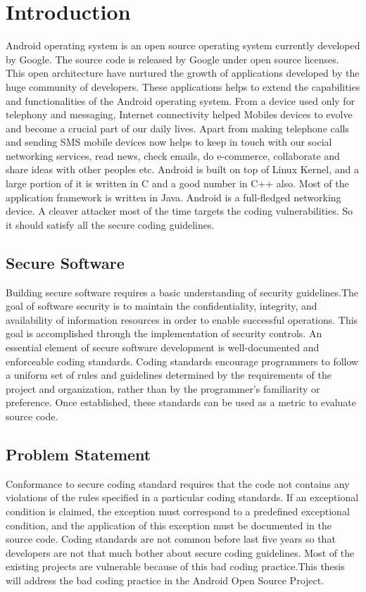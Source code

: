 \chapter{Introduction}

Android operating system is an open source operating system currently developed by Google. The source code is released by Google under open source licenses. This open architecture have nurtured the growth of applications developed by the huge community of developers. These applications helps to extend the capabilities and functionalities of the Android operating system. From a device used only for telephony and messaging, Internet connectivity helped Mobiles devices to evolve and become a crucial part of our daily lives. Apart from making telephone calls and sending SMS mobile devices now helps to keep in touch with our social networking services, read news, check emails, do e-commerce, collaborate and share ideas with other peoples etc. Android is built on top of Linux Kernel, and a large portion of it is written in C and a good number in C++ also. Most of the application framework is written in Java.  Android is a full-fledged networking device. A cleaver attacker most of the time targets the coding vulnerabilities. So it should satisfy all the secure coding guidelines. 
\section{Secure Software}
Building secure software requires a basic understanding of security guidelines.The goal of software security is to maintain the confidentiality, integrity, and availability of information resources in order to enable successful operations. This goal is accomplished through the implementation of security controls.  An essential element of secure software development is well-documented and enforceable coding standards. Coding standards encourage programmers to follow a uniform set of rules and guidelines determined by the requirements of the project and organization, rather than by the programmer’s familiarity or preference. Once established, these standards can be used as a metric to evaluate source code.\cite{nist}
\newpage
\section{Problem Statement}

Conformance to secure coding standard requires that the code not contains any violations of the rules specified in a particular coding standards. If an exceptional condition is claimed, the exception must correspond to a predefined exceptional condition, and the application of this exception must be documented in the source code\cite{cert-c}. Coding standards are not common before last five years so that developers are not that much bother about secure coding guidelines. Most of the existing projects are vulnerable because of this bad coding practice.This thesis will address the bad coding practice in the Android Open Source Project.
